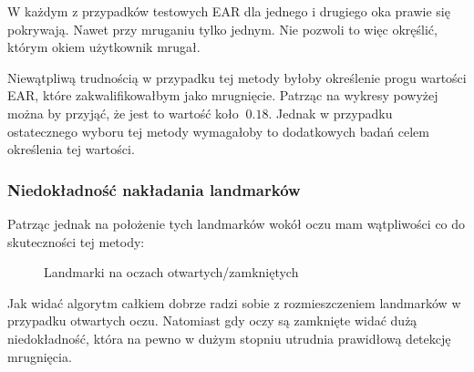 \vspace{3mm}
W każdym z przypadków testowych EAR dla jednego i drugiego oka prawie się pokrywają. Nawet przy mruganiu tylko jednym. Nie pozwoli to więc okręślić, którym okiem użytkownik mrugał.

\vspace{3mm}

Niewątpliwą trudnością w przypadku tej metody byłoby określenie progu wartości EAR, które zakwalifikowałbym jako mrugnięcie. Patrząc na wykresy powyżej można by przyjąć, że jest to wartość koło $~0.18$. Jednak w przypadku ostatecznego wyboru tej metody wymagałoby to dodatkowych badań celem określenia tej wartości.


\subsubsection{Niedokładność nakładania landmarków}

Patrząc jednak na położenie tych landmarków wokół oczu mam wątpliwości co do skuteczności tej metody:

\begin{figure}[!h]
    \begin{center}
        \hspace{8mm}
    \end{center}
    \caption{Landmarki na oczach otwartych/zamkniętych}
    \label{fig:landmarks_accuracy_}
\end{figure}

Jak widać algorytm całkiem dobrze radzi sobie z rozmieszczeniem landmarków w przypadku otwartych oczu. Natomiast gdy oczy są zamknięte widać dużą niedokładność, która na pewno w dużym stopniu utrudnia prawidłową detekcję mrugnięcia.